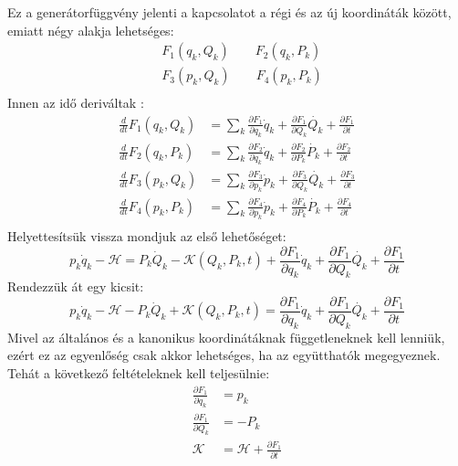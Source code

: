 \documentclass[../main.tex]{subfiles}
\begin{document}
Ez a generátorfüggvény jelenti a kapcsolatot a régi és az új koordináták között, emiatt négy alakja lehetséges:
\begin{equation}
    \begin{aligned}
        &F_1(q_k, Q_k) \qquad F_2(q_k, P_k) \\
        &F_3(p_k, Q_k) \qquad F_4(p_k, P_k) \\
    \end{aligned}
\end{equation}
Innen az idő deriváltak :
\begin{equation}
    \begin{aligned}
        \frac{d}{dt} F_1(q_k, Q_k) &= \sum_k \frac{\partial F_1}{\partial q_k} \dot{q}_k + \frac{\partial F_1}{\partial Q_k} \dot{Q_k} + \frac{\partial F_1}{\partial t} \\
        \frac{d}{dt} F_2(q_k, P_k) &= \sum_k \frac{\partial F_2}{\partial q_k} \dot{q}_k + \frac{\partial F_2}{\partial P_k} \dot{P_k} + \frac{\partial F_2}{\partial t} \\
        \frac{d}{dt} F_3(p_k, Q_k) &= \sum_k \frac{\partial F_3}{\partial p_k} \dot{p}_k + \frac{\partial F_3}{\partial Q_k} \dot{Q_k} + \frac{\partial F_3}{\partial t} \\
        \frac{d}{dt} F_4(p_k, P_k) &= \sum_k \frac{\partial F_4}{\partial p_k} \dot{p}_k + \frac{\partial F_4}{\partial P_k} \dot{P_k} + \frac{\partial F_4}{\partial t} \\
    \end{aligned}
\end{equation}
Helyettesítsük vissza mondjuk az első lehetőséget:
\begin{equation}
    p_k\dot{q}_k - \mathcal{H} = P_k \dot{Q}_k - \mathcal{K}(Q_k, P_k, t) + \frac{\partial F_1}{\partial q_k} \dot{q}_k + \frac{\partial F_1}{\partial Q_k} \dot{Q_k} + \frac{\partial F_1}{\partial t}
\end{equation}
Rendezzük át egy kicsit:
\begin{equation}
    p_k\dot{q}_k - \mathcal{H} - P_k \dot{Q}_k + \mathcal{K}(Q_k, P_k, t) =  \frac{\partial F_1}{\partial q_k} \dot{q}_k + \frac{\partial F_1}{\partial Q_k} \dot{Q_k} + \frac{\partial F_1}{\partial t}
\end{equation}
Mivel az általános és a kanonikus koordinátáknak függetleneknek kell lenniük, ezért ez az egyenlőség csak akkor lehetséges, ha az együtthatók megegyeznek. Tehát a következő feltételeknek kell teljesülnie:
\begin{equation}
    \begin{aligned}
        \frac{\partial F_1}{\partial q_k} &= p_k \\
        \frac{\partial F_1}{\partial Q_k} &= - P_k \\
        \mathcal{K} &= \mathcal{H} + \frac{\partial F_1}{\partial t}
    \end{aligned}
\end{equation}
\end{document}

